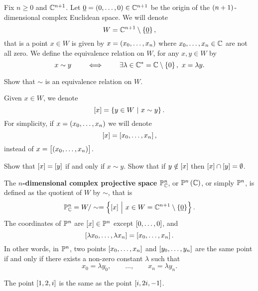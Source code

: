 \pagebreak

\begin{notation}
Fix $ n \ge 0 $ and $ \mathbb{C}^{n + 1} $. Let $ \underline{0} = \br{0, \dots, 0} \in \CC^{n + 1} $ be the origin of the $ \br{n + 1} $-dimensional complex Euclidean space. We will denote
$$ W = \CC^{n + 1} \setminus \cbr{\underline{0}}, $$
that is a point $ x \in W $ is given by $ x = \br{x_0, \dots, x_n} $ where $ x_0, \dots, x_n \in \mathbb{C} $ are not all zero. We define the equivalence relation on $ W $, for any $ x, y \in W $ by
$$ x \sim y \qquad \iff \qquad \exists \lambda \in \CC^* = \CC \setminus \cbr{0}, \ x = \lambda y. $$
\end{notation}

\begin{exercise**}
Show that $ \sim $ is an equivalence relation on $ W $.
\end{exercise**}

\begin{notation}
Given $ x \in W $, we denote
$$ \sbr{x} = \cbr{y \in W \st x \sim y}. $$
For simplicity, if $ x = \br{x_0, \dots, x_n} $ we will denote
$$ \sbr{x} = \sbr{x_0, \dots, x_n}, $$
instead of $ x = \sbr{\br{x_0, \dots, x_n}} $.
\end{notation}

\begin{exercise**}
Show that $ \sbr{x} = \sbr{y} $ if and only if $ x \sim y $. Show that if $ y \notin \sbr{x} $ then $ \sbr{x} \cap \sbr{y} = \emptyset $.
\end{exercise**}

\begin{definition}
The \textbf{$ n $-dimensional complex projective space} $ \mathbb{P}_{\mathbb{C}}^n $, or $ \PP^n\br{\CC} $, or simply $ \mathbb{P}^n $, is defined as the quotient of $ W $ by $ \sim $, that is
$$ \PP_\CC^n = W / \sim = \cbr{\sbr{x} \st x \in W = \CC^{n + 1} \setminus \cbr{\underline{0}}}. $$
The coordinates of $ \mathbb{P}^n $ are $ \sbr{x} \in \PP^n $ except $ \sbr{0, \dots, 0} $, and
$$ \sbr{\lambda x_0, \dots, \lambda x_n} = \sbr{x_0, \dots, x_n}. $$
In other words, in $ \mathbb{P}^n $, two points $ \sbr{x_0, \dots, x_n} $ and $ \sbr{y_0, \dots, y_n} $ are the same point if and only if there exists a non-zero constant $ \lambda $ such that
$$ x_0 = \lambda y_0, \qquad \dots, \qquad x_n = \lambda y_n. $$
\end{definition}

\begin{example}
The point $ \sbr{1, 2, i} $ is the same as the point $ \sbr{i, 2i, -1} $.
\end{example}

